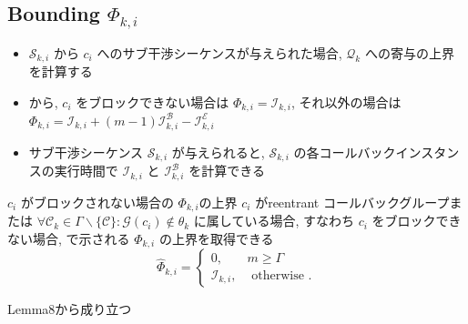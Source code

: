 \subsection{Bounding $\Phi_{k, i}$}
\label{ssec: bounding_phi}

\begin{frame}{}
    \begin{itemize}
        \item $\mathcal{S}_{k, i}$ から $c_{i}$ へのサブ干渉シーケンスが与えられた場合, $\mathcal{Q}_{k}$ への寄与の上界を計算する
        \item {}から, $c_{i}$ をブロックできない場合は $\Phi_{k, i}=\mathcal{I}_{k, i}$, それ以外の場合は $\Phi_{k, i}=\mathcal{I}_{k, i}+(m-1) \mathcal{I}_{k, i}^{\mathcal{B}}-\mathcal{I}_{k, i}^{\mathcal{E}}$
        \item サブ干渉シーケンス $\mathcal{S}_{k, i}$ が与えられると, $\mathcal{S}_{k, i}$ の各コールバックインスタンスの実行時間で $\mathcal{I}_{k, i}$ と $\mathcal{I}_{k, i}^{\mathcal{B}}$ を計算できる
    \end{itemize}
\end{frame}

\begin{frame}{$c_{i}$ がブロックされない場合の $\Phi_{k, i}$の上界}
    $c_{i}$ がreentrant コールバックグループまたは $\forall \mathcal{C}_{k} \in \Gamma \backslash\{\mathcal{C}\}: \mathcal{G}\left(c_{i}\right) \notin \theta_{k}$ に属している場合, すなわち $c_{i}$ をブロックできない場合,  で示される $\Phi_{k, i}$ の上界を取得できる
    \begin{equation*}
        \hat{\Phi}_{k, i}=\left\{\begin{array}{lr}
            0,                  & m \geq \Gamma         \\
            \mathcal{I}_{k, i}, & \text { otherwise } .
        \end{array}\right.
    \end{equation*}

    Lemma8から成り立つ
\end{frame}

